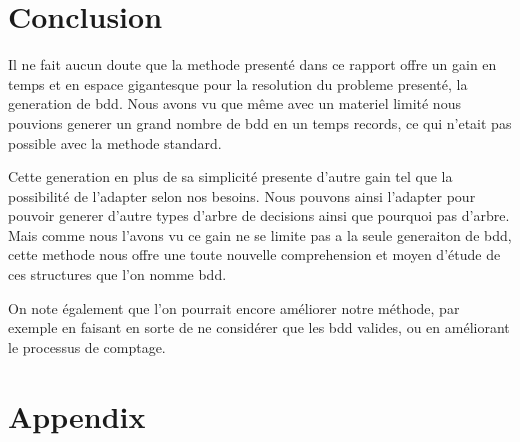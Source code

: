 \documentclass[french]{article}
\begin{document}
\newpage

\section{Conclusion}
Il ne fait aucun doute que la methode presenté dans ce rapport offre un gain en temps et en espace gigantesque pour la resolution du probleme presenté, la generation de bdd. Nous avons vu que même avec un materiel limité nous pouvions generer un grand nombre de bdd en un temps records, ce qui n'etait pas possible avec la methode standard. 

Cette generation en plus de sa simplicité presente d'autre gain tel que la possibilité de l'adapter selon nos besoins. Nous pouvons ainsi l'adapter pour pouvoir generer d'autre types d'arbre de decisions ainsi que pourquoi pas d'arbre. 
Mais comme nous l'avons vu ce gain ne se limite pas a la seule generaiton de bdd, cette methode nous offre une toute nouvelle comprehension et moyen d'étude de ces structures que l'on nomme bdd.

On note également que l'on pourrait encore améliorer notre méthode, par exemple en faisant en sorte de ne considérer que les bdd valides, ou en améliorant le processus de comptage. 
\newpage
\section{Appendix}
\end{document}
